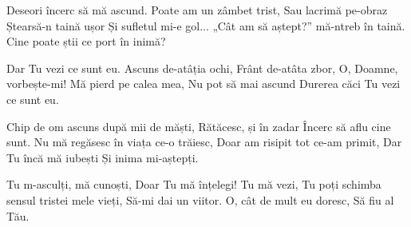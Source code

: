
\beginverse
Deseori încerc să mă ascund.
Poate am un zâmbet trist,
Sau lacrimă pe-obraz
Ștearsă-n taină ușor
Și sufletul mi-e gol...
„Cât am să aștept?” mă-ntreb în taină.
Cine poate știi ce port în inimă?
\endverse

\beginchorus
Dar Tu vezi ce sunt eu.
Ascuns de-atâția ochi,
Frânt de-atâta zbor,
O, Doamne, vorbește-mi!
Mă pierd pe calea mea,
Nu pot să mai ascund
Durerea căci Tu vezi ce sunt eu.
\endchorus

\beginverse
Chip de om ascuns după mii de măști,
Rătăcesc, și în zadar
Încerc să aflu cine sunt.
Nu mă regăsesc în viața ce-o trăiesc,
Doar am risipit tot ce-am primit,
Dar Tu încă mă iubești
Și inima mi-aștepți.
\endverse

\beginverse
Tu m-asculți, mă cunoști,
Doar Tu mă înțelegi!
Tu mă vezi,
Tu poți schimba sensul tristei mele vieți,
Să-mi dai un viitor.
O, cât de mult eu doresc,
Să fiu al Tău.
\endverse

\endsong